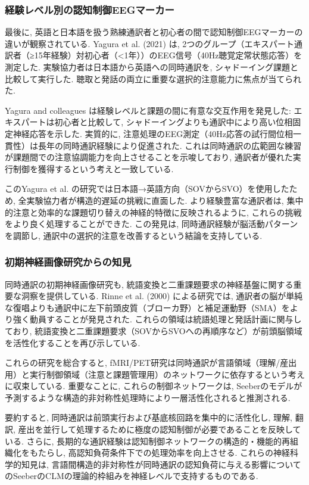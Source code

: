 \subsubsection{経験レベル別の認知制御EEGマーカー}

最後に, 英語と日本語を扱う熟練通訳者と初心者の間で認知制御EEGマーカーの違いが観察されている.
Yagura et al. (2021) \cite{yagura2021selective}は, 2つのグループ（エキスパート通訳者（≥15年経験）対初心者（<1年））のEEG信号（40Hz聴覚定常状態応答）を測定した.
実験協力者は日本語から英語への同時通訳を, シャドーイング課題と比較して実行した.
聴取と発話の両立に重要な選択的注意能力に焦点が当てられた.

Yagura and colleagues は経験レベルと課題の間に有意な交互作用を発見した:
エキスパートは初心者と比較して, シャドーイングよりも通訳中により高い位相固定神経応答を示した.
実質的に, 注意処理のEEG測定（40Hz応答の試行間位相一貫性）は長年の同時通訳経験により促進された.
これは同時通訳の広範囲な練習が課題間での注意協調能力を向上させることを示唆しており, 通訳者が優れた実行制御を獲得するという考えと一致している.

このYagura et al. の研究では日本語→英語方向（SOVからSVO）を使用したため, 全実験協力者が構造的遅延の挑戦に直面した.
より経験豊富な通訳者は, 集中的注意と効率的な課題切り替えの神経的特徴に反映されるように, これらの挑戦をより良く処理することができた.
この発見は, 同時通訳経験が脳活動パターンを調節し, 通訳中の選択的注意を改善するという結論を支持している.

\subsubsection{初期神経画像研究からの知見}

同時通訳の初期神経画像研究も, 統語変換と二重課題要求の神経基盤に関する重要な洞察を提供している.
Rinne et al. (2000) による研究では, 通訳者の脳が単純な復唱よりも通訳中に左下前頭皮質（ブローカ野）と補足運動野（SMA）をより強く動員することが発見された.
これらの領域は統語処理と発話計画に関与しており, 統語変換と二重課題要求（SOVからSVOへの再順序など）が前頭脳領域を活性化することを再び示している.

これらの研究を総合すると, fMRI/PET研究は同時通訳が言語領域（理解/産出用）と実行制御領域（注意と課題管理用）のネットワークに依存するという考えに収束している.
重要なことに, これらの制御ネットワークは, Seeberのモデルが予測するような構造的非対称性処理時により一層活性化されると推測される.

要約すると, 同時通訳は前頭実行および基底核回路を集中的に活性化し, 理解, 翻訳, 産出を並行して処理するために極度の認知制御が必要であることを反映している.
さらに, 長期的な通訳経験は認知制御ネットワークの構造的・機能的再組織化をもたらし, 高認知負荷条件下での処理効率を向上させる.
これらの神経科学的知見は, 言語間構造的非対称性が同時通訳の認知負荷に与える影響についてのSeeberのCLMの理論的枠組みを神経レベルで支持するものである.

